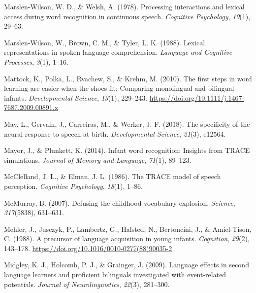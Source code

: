 \documentclass[
  12pt,
  b5paperpaper,
  twoside]{scrreprt}
\newlength{\cslhangindent}
\newlength{\cslentryspacingunit} %
\newenvironment{CSLReferences}[2] %
 {%
  \setlength{\parindent}{0pt}
  \ifodd #1
  \let\oldpar\par
  \def\par{\hangindent=\cslhangindent\oldpar}
  \fi
  \setlength{\parskip}{#2\cslentryspacingunit}
 }%
 {}
\begin{document}
\begin{CSLReferences}{1}{0}
\leavevmode{}%
Marslen-Wilson, W. D., \& Welsh, A. (1978). Processing interactions and
lexical access during word recognition in continuous speech.
\emph{Cognitive Psychology}, \emph{10}(1), 29--63.

\leavevmode{}%
Marslen-Wilson, W., Brown, C. M., \& Tyler, L. K. (1988). Lexical
representations in spoken language comprehension. \emph{Language and
Cognitive Processes}, \emph{3}(1), 1--16.

\leavevmode{}%
Mattock, K., Polka, L., Rvachew, S., \& Krehm, M. (2010). The first
steps in word learning are easier when the shoes fit: Comparing
monolingual and bilingual infants. \emph{Developmental Science},
\emph{13}(1), 229--243.
\url{https://doi.org/10.1111/j.1467-7687.2009.00891.x}

\leavevmode{}%
May, L., Gervain, J., Carreiras, M., \& Werker, J. F. (2018). The
specificity of the neural response to speech at birth.
\emph{Developmental Science}, \emph{21}(3), e12564.

\leavevmode{}%
Mayor, J., \& Plunkett, K. (2014). Infant word recognition: Insights
from TRACE simulations. \emph{Journal of Memory and Language},
\emph{71}(1), 89--123.

\leavevmode{}%
McClelland, J. L., \& Elman, J. L. (1986). The TRACE model of speech
perception. \emph{Cognitive Psychology}, \emph{18}(1), 1--86.

\leavevmode{}%
McMurray, B. (2007). Defusing the childhood vocabulary explosion.
\emph{Science}, \emph{317}(5838), 631--631.

\leavevmode{}%
Mehler, J., Jusczyk, P., Lambertz, G., Halsted, N., Bertoncini, J., \&
Amiel-Tison, C. (1988). A precursor of language acquisition in young
infants. \emph{Cognition}, \emph{29}(2), 143--178.
\url{https://doi.org/10.1016/0010-0277(88)90035-2}

\leavevmode{}%
Midgley, K. J., Holcomb, P. J., \& Grainger, J. (2009). Language effects
in second language learners and proficient bilinguals investigated with
event-related potentials. \emph{Journal of Neurolinguistics},
\emph{22}(3), 281--300.


\end{CSLReferences}
\end{document}
